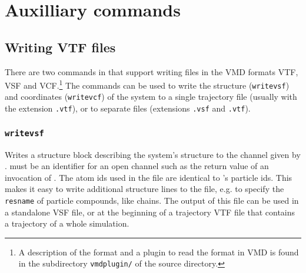 \chapter{Auxilliary commands}
\label{chap:aux}

\section{Writing VTF files}

There are two commands in \es{} that support writing files in the VMD
formats VTF, VSF and VCF.\footnote{A description of the format and a
  plugin to read the format in VMD is found in the subdirectory
  \texttt{vmdplugin/} of the \es{} source directory.} The commands can
be used to write the structure (\texttt{writevsf}) and coordinates
(\texttt{writevcf}) of the system to a single trajectory file (usually
with the extension \texttt{.vtf}), or to separate files (extensions
\texttt{.vsf} and \texttt{.vtf}).

\subsection{\texttt{writevsf}}

{   }

Writes a structure block describing the system's structure to the
channel given by .  must be an
identifier for an open channel such as the return value of an
invocation of . The atom ids used in the file are
identical to \es's particle ids.  This makes it easy to write
additional structure lines to the file, e.g. to specify the
\texttt{resname} of particle compounds, like chains.  The output of
this file can be used in a standalone VSF file, or at the beginning of
a trajectory VTF file that contains a trajectory of a whole
simulation.

